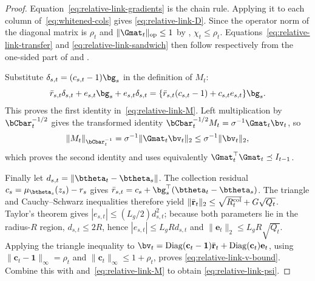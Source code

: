 \begin{proof}
Equation~\eqref{eq:relative-link-gradients} is the chain rule.  Applying it to
each column of~\eqref{eq:whitened-cols} gives
\eqref{eq:relative-link-D}.  Since the operator norm of the diagonal matrix is
$\rho_t$ and $\|\Gmat_t\|_{\rm op}\le1$ by ,
$\chi_t\le\rho_t$.  Equations~\eqref{eq:relative-link-transfer} and
\eqref{eq:relative-link-sandwich} then follow respectively from the one-sided
part of  and .

Substitute $\delta_{s,t}=(c_{s,t}-1)\bg_s$ in the definition of $M_t$:
\[
 \bar r_{s,t}\delta_{s,t}+e_{s,t}\bg_s+e_{s,t}\delta_{s,t}
 =\{\bar r_{s,t}(c_{s,t}-1)+c_{s,t}e_{s,t}\}\bg_s.
\]
This proves the first identity in~\eqref{eq:relative-link-M}.  Left
multiplication by $\bCbar_t^{-1/2}$ gives the transformed identity
$\bCbar_t^{-1/2}M_t=\sigma^{-1}\Gmat_t\bv_t$, so
\[
 \|M_t\|_{\bCbar_t^{-1}}
 =\sigma^{-1}\|\Gmat_t\bv_t\|_2
 \le\sigma^{-1}\|\bv_t\|_2,
\]
which proves the second identity and uses equivalently
$\Gmat_t^\top\Gmat_t\preceq I_{t-1}$.

Finally let $d_{s,t}=\|\btheta_t-\btheta_s\|$.  The collection residual
$c_s=\mu_{\btheta_s}(z_s)-r_s$ gives
$\bar r_{s,t}=c_s+\bg_s^\top(\btheta_t-\btheta_s)$.  The triangle and
Cauchy--Schwarz inequalities therefore yield
$\|\bar{\mathbf r}_t\|_2\le\sqrt{R_t^{\rm col}}+G\sqrt{Q_t}$.
Taylor's theorem gives $|e_{s,t}|\le(L_g/2)d_{s,t}^2$; because both parameters
lie in the radius-$R$ region, $d_{s,t}\le2R$, hence
$|e_{s,t}|\le L_gR d_{s,t}$ and
$\|\mathbf e_t\|_2\le L_gR\sqrt{Q_t}$.  Applying the triangle inequality to
$\bv_t=\operatorname{Diag}(\mathbf c_t-\mathbf{1})\bar{\mathbf r}_t
+\operatorname{Diag}(\mathbf c_t)\mathbf e_t$, using
$\|\mathbf c_t-\mathbf{1}\|_\infty=\rho_t$ and
$\|\mathbf c_t\|_\infty\le1+\rho_t$, proves
\eqref{eq:relative-link-v-bound}.  Combine this with
 and~\eqref{eq:relative-link-M} to obtain
\eqref{eq:relative-link-psi}.
\end{proof}

